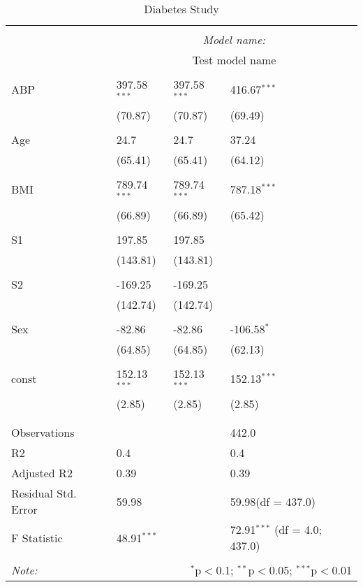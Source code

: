 \documentclass[12pt]{article}
\numberwithin{equation}{subsection}
\begin{document}
\begin{table}[!htbp] \centering
  \caption{Diabetes Study}
  \label{}
\begin{tabularx}{\textwidth}{lXXX}
\\[-1.8ex]\hline
\hline \\[-1.8ex]
& \multicolumn{3}{c}{\textit{Model name:}} \
\cr \cline{3-4}
\\[-1.8ex] & \multicolumn{3}{c}{Test model name} \\\hline \\[-1.8ex]
 ABP & 397.58$^{***}$ & 397.58$^{***}$ & 416.67$^{***}$ \\
  & (70.87) & (70.87) & (69.49) \\
  & & & \\
 Age & 24.7$^{}$ & 24.7$^{}$ & 37.24$^{}$ \\
  & (65.41) & (65.41) & (64.12) \\
  & & & \\
 BMI & 789.74$^{***}$ & 789.74$^{***}$ & 787.18$^{***}$ \\
  & (66.89) & (66.89) & (65.42) \\
  & & & \\
 S1 & 197.85$^{}$ & 197.85$^{}$ & \\
  & (143.81) & (143.81) & \\
  & & & \\
 S2 & -169.25$^{}$ & -169.25$^{}$ & \\
  & (142.74) & (142.74) & \\
  & & & \\
 Sex & -82.86$^{}$ & -82.86$^{}$ & -106.58$^{*}$ \\
  & (64.85) & (64.85) & (62.13) \\
  & & & \\
 const & 152.13$^{***}$ & 152.13$^{***}$ & 152.13$^{***}$ \\
  & (2.85) & (2.85) & (2.85) \\
  & & & \\
\hline \\[-1.8ex]
 Observations &   &   & 442.0 \\
 R${2}$ & 0.4 &   & 0.4 \\
 Adjusted R${2}$ & 0.39 &   & 0.39 \\
 Residual Std. Error & 59.98 &   & 59.98(df = 437.0)  \\
 F Statistic & 48.91$^{***}$  &     & 72.91$^{***}$ (df = 4.0; 437.0) \\
\hline
\hline \\[-1.8ex]
\textit{Note:} & \multicolumn{3}{r}{$^{*}$p$<$0.1; $^{**}$p$<$0.05; $^{***}$p$<$0.01} \\
\end{tabularx}
\end{table}
\end{document}
